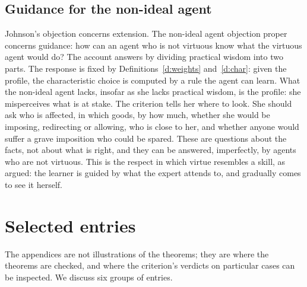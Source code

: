 \documentclass{situationist-preprint}
\begin{document}
\subsection{Guidance for the non-ideal agent}

Johnson's objection concerns extension. The non-ideal agent objection proper concerns guidance: how can an agent who is not virtuous know what the virtuous agent would do? The account answers by dividing practical wisdom into two parts. The response is fixed by Definitions~\ref{d:weights} and~\ref{d:char}: given the profile, the characteristic choice is computed by a rule the agent can learn. What the non-ideal agent lacks, insofar as she lacks practical wisdom, is the profile: she misperceives what is at stake. The criterion tells her where to look. She should ask who is affected, in which goods, by how much, whether she would be imposing, redirecting or allowing, who is close to her, and whether anyone would suffer a grave imposition who could be spared. These are questions about the facts, not about what is right, and they can be answered, imperfectly, by agents who are not virtuous. This is the respect in which virtue resembles a skill, as \citet{Annas2011} argued: the learner is guided by what the expert attends to, and gradually comes to see it herself.

\section{Selected entries}\label{s:entries}

The appendices are not illustrations of the theorems; they are where the theorems are checked, and where the criterion's verdicts on particular cases can be inspected. We discuss six groups of entries.
\end{document}
